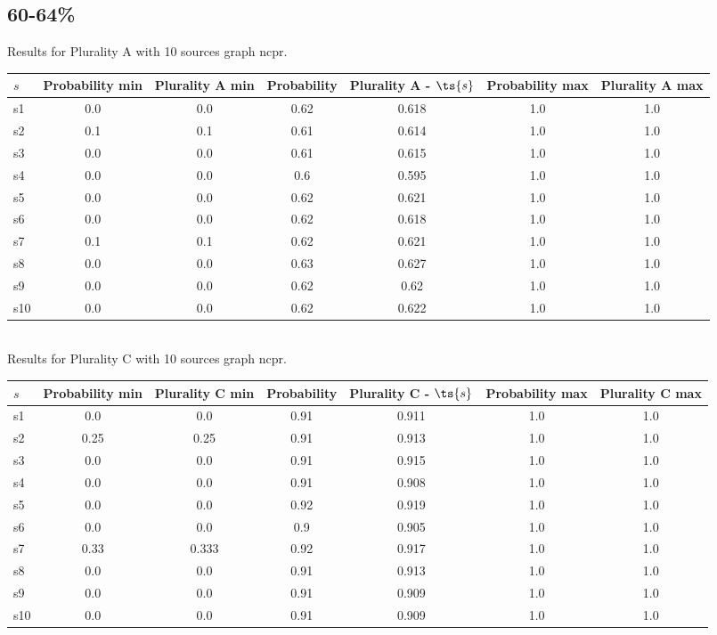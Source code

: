 \documentclass{article}
\begin{document}
\newpage

\subsection{60-64\%}

\noindent Results for Plurality A with 10 sources graph ncpr.

\noindent\begin{tabular}{|l|c|c|c|c|c|c|}
\hline
$s$& Probability min & Plurality A min & Probability & Plurality A - $\ts{s}$ & Probability max & Plurality A max\\
\hline
s1 &0.0 & 0.0 & 0.62 & 0.618 & 1.0 & 1.0\\
\hline
s2 &0.1 & 0.1 & 0.61 & 0.614 & 1.0 & 1.0\\
\hline
s3 &0.0 & 0.0 & 0.61 & 0.615 & 1.0 & 1.0\\
\hline
s4 &0.0 & 0.0 & 0.6 & 0.595 & 1.0 & 1.0\\
\hline
s5 &0.0 & 0.0 & 0.62 & 0.621 & 1.0 & 1.0\\
\hline
s6 &0.0 & 0.0 & 0.62 & 0.618 & 1.0 & 1.0\\
\hline
s7 &0.1 & 0.1 & 0.62 & 0.621 & 1.0 & 1.0\\
\hline
s8 &0.0 & 0.0 & 0.63 & 0.627 & 1.0 & 1.0\\
\hline
s9 &0.0 & 0.0 & 0.62 & 0.62 & 1.0 & 1.0\\
\hline
s10 &0.0 & 0.0 & 0.62 & 0.622 & 1.0 & 1.0\\
\hline
\end{tabular}\\

\noindent Results for Plurality C with 10 sources graph ncpr.

\noindent\begin{tabular}{|l|c|c|c|c|c|c|}
\hline
$s$& Probability min & Plurality C min & Probability & Plurality C - $\ts{s}$ & Probability max & Plurality C max\\
\hline
s1 &0.0 & 0.0 & 0.91 & 0.911 & 1.0 & 1.0\\
\hline
s2 &0.25 & 0.25 & 0.91 & 0.913 & 1.0 & 1.0\\
\hline
s3 &0.0 & 0.0 & 0.91 & 0.915 & 1.0 & 1.0\\
\hline
s4 &0.0 & 0.0 & 0.91 & 0.908 & 1.0 & 1.0\\
\hline
s5 &0.0 & 0.0 & 0.92 & 0.919 & 1.0 & 1.0\\
\hline
s6 &0.0 & 0.0 & 0.9 & 0.905 & 1.0 & 1.0\\
\hline
s7 &0.33 & 0.333 & 0.92 & 0.917 & 1.0 & 1.0\\
\hline
s8 &0.0 & 0.0 & 0.91 & 0.913 & 1.0 & 1.0\\
\hline
s9 &0.0 & 0.0 & 0.91 & 0.909 & 1.0 & 1.0\\
\hline
s10 &0.0 & 0.0 & 0.91 & 0.909 & 1.0 & 1.0\\
\hline
\end{tabular}\\
\end{document}
